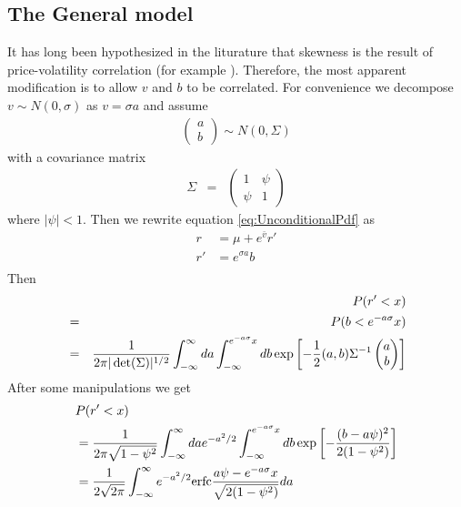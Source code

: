 \subsection{The General model}\label{sec:SLV_Asymmetric}
It has long been hypothesized in the liturature that skewness is the
result of price-volatility correlation (for example
\cite{Potters2003}). Therefore, the most apparent modification is to
allow $v$ and $b$ to be correlated. For convenience we decompose
$v \sim N(0, \sigma)$ as $v = \sigma a$ and assume
\begin{eqnarray*}
  \begin{pmatrix}
    a \\
    b
  \end{pmatrix} \sim N(0, \Sigma)
\end{eqnarray*}
with a covariance matrix
\begin{eqnarray*}
    \Sigma &=&
  \begin{pmatrix}
    1 & \psi \\
    \psi & 1
  \end{pmatrix}
\end{eqnarray*}
where $|\psi| < 1$. Then we rewrite equation \ref{eq:UnconditionalPdf}
as
\begin{equation}
  \label{eq:r_t}
  \begin{aligned}
    r &= \mu + e^{\bar{v}} r' \\
    r' &= e^{\sigma a} b \\
  \end{aligned}
\end{equation}
Then
\begin{eqnarray*}
  && P(r' < x)\\
  &=& P(b < e^{-a\sigma}x) \\
  &=& {1 \over 2\pi |\det(\Sigma)|^{1/2}}
  \int_{-\infty}^{\infty} da \int_{-\infty}^{e^{-a\sigma}x} db
  \exp\left[
    -{1 \over 2} (a, b) \Sigma^{-1}
    \begin{pmatrix}
      a \\
      b
    \end{pmatrix}
  \right] \\
\end{eqnarray*}
After some manipulations we get
\begin{equation}\label{eq:UncondCDFAsymmetric}
  \begin{aligned}
    & P(r' < x) \\  
    &= {1 \over 2\pi \sqrt{1 - \psi^2}} \int_{-\infty}^{\infty} da
    e^{-a^2/2} \int_{-\infty}^{e^{-a\sigma}x} db
    \exp\left[
      - {(b - a\psi)^2 \over 2(1 - \psi^2)}
    \right] \\
    &= {1 \over 2\sqrt{2\pi}} \int_{-\infty}^{\infty} e^{-a^2/2}
    \text{erfc}{a\psi - e^{-a\sigma} x \over \sqrt{2(1-\psi^2)}} da
  \end{aligned}
\end{equation}

